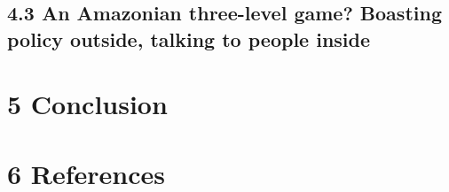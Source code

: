 \documentclass[
]{article}
\begin{document}
\hypertarget{an-amazonian-three-level-game-boasting-policy-outside-talking-to-people-inside}{%
\subsection{4.3 An Amazonian three-level game? Boasting policy outside,
talking to people
inside}\label{an-amazonian-three-level-game-boasting-policy-outside-talking-to-people-inside}}

\hypertarget{conclusion}{%
\section{5 Conclusion}\label{conclusion}}

\hypertarget{references}{%
\section*{6 References}\label{references}}
\end{document}

